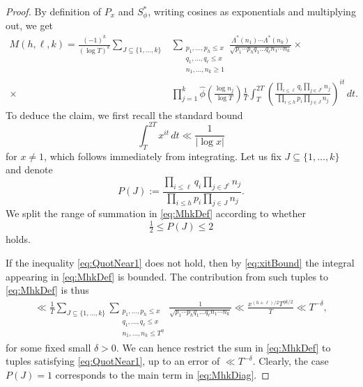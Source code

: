 \documentclass[10pt,a4paper]{amsart}
\newcommand{\Starphi}{S_\phi^*}
\begin{document}
\begin{proof}
    By definition of $P_x$ and $\Starphi$, writing cosines as exponentials and multiplying out, we get
    \begin{equation}\begin{split}\label{eq:MhkDef}
        M(h,\ell, k) = \frac{(-1)^k}{(\log T)^k} \sum_{J \subseteq \{1, \dots, k \}} &\sum_{\substack{p_1, \dots, p_h  \leq x\\
        q_1, \dots, q_\ell\leq x\\
        n_1, \dots, n_k \ge 1}} \frac{\Lambda^*(n_1) \cdots \Lambda^*(n_k)}{\sqrt{p_1\cdots p_h q_1\dots q_\ell n_1 \cdots n_k }} \times \\ \times &\prod_{j=1}^k \hat\phi\left(\frac{\log n_j}{\log T}\right) \frac{1}{T} \int_T^{2 T} \left( \frac{\prod_{i\leq \ell} q_i \prod_{j \in J^c} n_j}{\prod_{i\leq h} p_i \prod_{j \in J} n_j} \right)^{i t} \, dt.
    \end{split}\end{equation}
    To deduce the claim, we first recall the standard bound
    \begin{equation}\label{eq:xitBound}
        \int_T^{2T} x^{it} \, dt \ll \frac{1}{| \log x |}
    \end{equation} 
    for $x \ne 1$, which follows immediately from integrating.
    Let us fix $J\subseteq\{1, \dots, k\}$  and denote $$P(J):=\frac{\prod_{i\leq \ell} q_i \prod_{j \in J^c} n_j}{\prod_{i\leq h} p_i \prod_{j \in J} n_j}.$$ 
    We split the range of summation in \eqref{eq:MhkDef} according to whether
    \begin{equation}\label{eq:QuotNear1}
        \tfrac{1}{2} \le P(J)  \le 2
    \end{equation}
    holds. 
    
    If the inequality \eqref{eq:QuotNear1} does not hold, then by \eqref{eq:xitBound} the integral appearing in \eqref{eq:MhkDef} is bounded. The contribution from such tuples to \eqref{eq:MhkDef} is thus
    \begin{align*}
        \ll \frac{1}{T} \sum_{J \subseteq \{1, \dots, k \}} \sum_{\substack{p_1, \dots, p_h\leq x \\
        q_1, \dots, q_\ell\leq x\\
        n_1, \dots, n_k \le T^\eta
        }} \frac{1}{\sqrt{p_1\cdots p_h  q_1\dots q_\ell n_1 \cdots n_k}} 
        \ll \frac{x^{(h+\ell)/2}T^{\eta k/2}}{T}
        \ll T^{-\delta},
    \end{align*}
    for some fixed small $\delta>0$.
    We can hence restrict the sum in \eqref{eq:MhkDef} to tuples satisfying \eqref{eq:QuotNear1}, up to an error of $\ll T^{-\delta}$. Clearly, the case $P(J)=1$
    corresponds to the main term in \eqref{eq:MhkDiag}. 
    

\end{proof}
\end{document}
